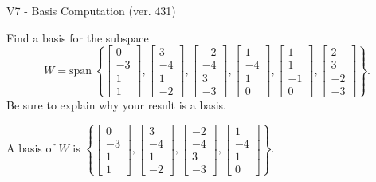 \begin{exercise}
  \begin{exerciseTitle}V7 - Basis Computation (ver. 431)\end{exerciseTitle}
  \begin{exerciseStatement}
    Find a basis for the subspace 
\[W=\mathrm{span}\ \left\{\left[\begin{array}{r}
0 \\
-3 \\
1 \\
1
\end{array}\right] , \left[\begin{array}{r}
3 \\
-4 \\
1 \\
-2
\end{array}\right] , \left[\begin{array}{r}
-2 \\
-4 \\
3 \\
-3
\end{array}\right] , \left[\begin{array}{r}
1 \\
-4 \\
1 \\
0
\end{array}\right] , \left[\begin{array}{r}
1 \\
1 \\
-1 \\
0
\end{array}\right] , \left[\begin{array}{r}
2 \\
3 \\
-2 \\
-3
\end{array}\right]\right\}.\]
 Be sure to explain why your result is a basis.


  \end{exerciseStatement}
  \begin{exerciseAnswer}
   A basis of \(W\) is  \(\left\{\left[\begin{array}{r}
0 \\
-3 \\
1 \\
1
\end{array}\right] , \left[\begin{array}{r}
3 \\
-4 \\
1 \\
-2
\end{array}\right] , \left[\begin{array}{r}
-2 \\
-4 \\
3 \\
-3
\end{array}\right] , \left[\begin{array}{r}
1 \\
-4 \\
1 \\
0
\end{array}\right]\right\}\).
  


  \end{exerciseAnswer}
\end{exercise}